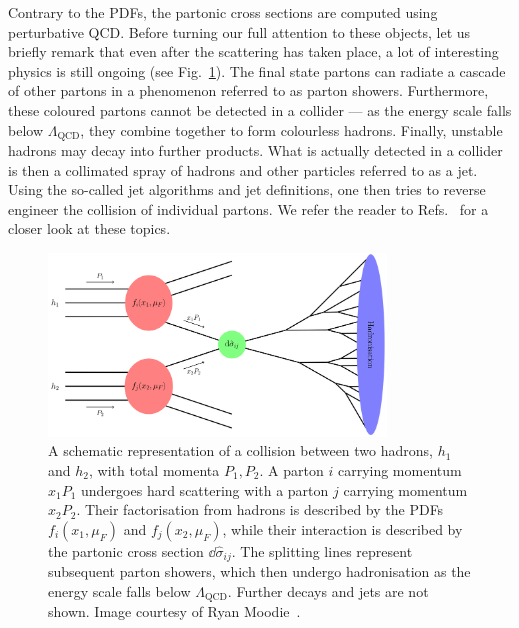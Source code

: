 \documentclass[main.tex]{subfiles}
\begin{document}
Contrary to the PDFs, the partonic cross sections are computed using perturbative QCD. Before turning our full attention to these objects, let us briefly remark that even after the scattering has taken place, a lot of interesting physics is still ongoing (see Fig.~\ref{fig:collision}). The final state partons can radiate a cascade of other partons in a phenomenon referred to as parton showers. Furthermore, these coloured partons cannot be detected in a collider --- as the energy scale falls below $\Lambda_\text{QCD}$, they combine together to form colourless hadrons. Finally, unstable hadrons may decay into further products. What is actually detected in a collider is then a collimated spray of hadrons and other particles referred to as a jet. Using the so-called jet algorithms and jet definitions, one then tries to reverse engineer the collision of individual partons. We refer the reader to Refs.~\cite{Plehn:2009nd, Hoche:2014rga} for a closer look at these topics.
\begin{figure}
    \begin{center}
        \includegraphics[width=0.8\textwidth]{img/collision.png}
        \caption{
            A schematic representation of a collision between two hadrons, $h_1$ and $h_2$, with total momenta $P_1, P_2$. A parton $i$ carrying momentum $x_1 P_1$ undergoes hard scattering with a parton $j$ carrying momentum $x_2 P_2$. Their factorisation from hadrons is described by the PDFs $f_i(x_1, \mu_F)$ and $f_j(x_2, \mu_F)$, while their interaction is described by the partonic cross section $\dd\hat\sigma_{ij}$. The splitting lines represent subsequent parton showers, which then undergo hadronisation as the energy scale falls below $\Lambda_\text{QCD}$. Further decays and jets are not shown. Image courtesy of Ryan Moodie~\cite{Moodie:2022dxs}.
        }
        \label{fig:collision}
    \end{center}
\end{figure}
\end{document}
